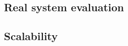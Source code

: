 \documentclass[conference]{IEEEtran}
\begin{document}
\subsection{Real system evaluation}


\subsection{Scalability}









% 
% 




\end{document}
